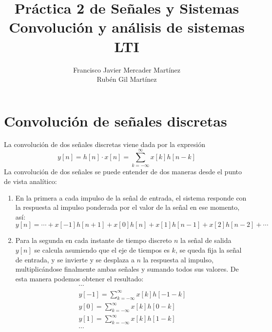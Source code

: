 \documentclass[12pt]{article}
\title{\textbf{\huge Práctica 2 de Señales y Sistemas}\\ Convolución y análisis de sistemas LTI}
\author{Francisco Javier Mercader Martínez\\ Rubén Gil Martínez}
\begin{document}
	\maketitle
	\newpage
	\section{Convolución de señales discretas}
La convolución de dos señales discretas viene dada por la expresión \[ y[n]=h[n]\cdot x[n]=\sum_{k=-\infty}^{\infty}x[k]h[n-k] \]La convolución de dos señales se puede entender de dos maneras desde el punto de vista analítico:
\begin{enumerate}[label=\arabic*)]
	\item En la primera a cada impulso de la señal de entrada, el sistema responde con la respuesta al impulso ponderada por el valor de la señal en ese momento, así: \[ y[n]=\cdots+x[-1]h[n+1]+x[0]h[n]+x[1]h[n-1]+x[2]h[n-2]+\cdots \]
	\item Para la segunda en cada instante de tiempo discreto $n$ la señal de salida $y[n]$ se calcula asumiendo que el eje de tiempos es $k$, se queda fija la señal de entrada, y se invierte y  se desplaza a $n$ la respuesta al impulso, multiplicándose finalmente ambas señales y sumando todos sus valores. De esta manera podemos obtener el resultado:
	\[ \begin{array}{l}
		\cdots\\
		y[-1]=\sum_{k=-\infty}^{\infty}x[k]h[-1-k]\\
		y[0]=\sum_{k=-\infty}^{\infty}x[k]h[0-k]\\
		y[1]=\sum_{k=-\infty}^{\infty}x[k]h[1-k]\\
		\cdots
	\end{array} \]
\end{enumerate}
\end{document}
